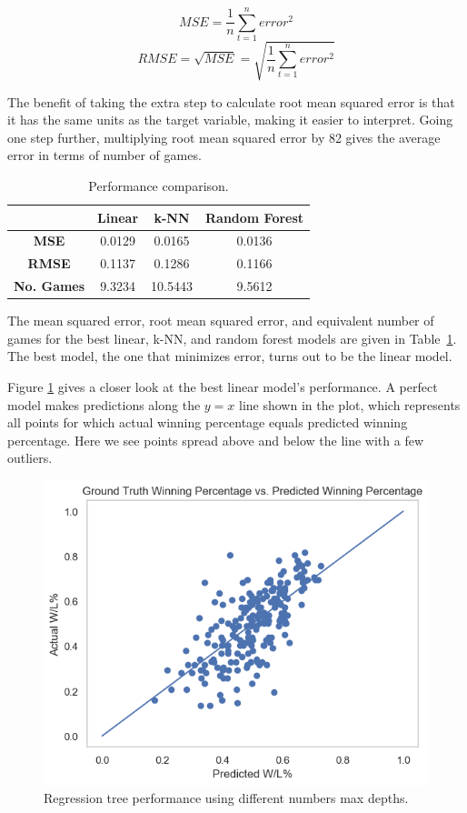 \documentclass[pageno]{jpaper}
\begin{document}
$$MSE = \frac{1}{n}\sum_{t=1}^{n}error^2$$
$$RMSE = \sqrt{MSE} = \sqrt{\frac{1}{n}\sum_{t=1}^{n}error^2}$$

The benefit of taking the extra step to calculate root mean squared error is that it has the same units as the target variable, making it easier to interpret. Going one step further, multiplying root mean squared error by 82 gives the average error in terms of number of games. 

\begin{table}[hbt]
  \centering
  \begin{tabular}{|cccc|}
    \hline
    & \textbf{Linear} & \textbf{k-NN} & \textbf{Random Forest}\\
    \hline
    \textbf{MSE} & 0.0129 & 0.0165 & 0.0136\\
    \textbf{RMSE} & 0.1137 & 0.1286 & 0.1166\\
    \textbf{No. Games} & 9.3234 & 10.5443 & 9.5612\\
    \hline
  \end{tabular}
  \caption{Performance comparison.}
  \label{table:errors}
\end{table}

The mean squared error, root mean squared error, and equivalent number of games for the best linear, k-NN, and random forest models are given in Table~\ref{table:errors}. The best model, the one that minimizes error, turns out to be the linear model.

Figure \ref{fig:actualvspredicted} gives a closer look at the best linear model's performance. A perfect model makes predictions along the $y=x$ line shown in the plot, which represents all points for which actual winning percentage equals predicted winning percentage. Here we see points spread above and below the line with a few outliers.

\begin{figure}[hbt]
\centering
\includegraphics[width=0.75\linewidth]{actualvspredicted.png}
\caption{Regression tree performance using different numbers max depths.}
\label{fig:actualvspredicted}
\end{figure}
\end{document}
